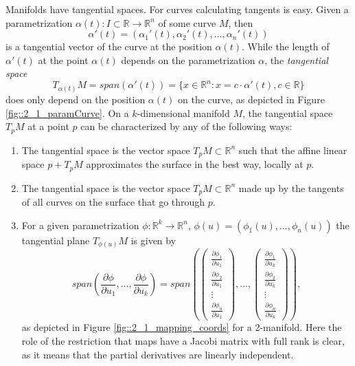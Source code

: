 Manifolds have tangential spaces.
For curves calculating tangents is easy. Given a parametrization $\alpha(t): I \subset \mathbb R \to \mathbb R^n$ of some curve $M$, then $$\alpha'(t) = (\alpha_1'(t),\alpha_2'(t),...,\alpha_n'(t))$$ is a tangential vector of the curve at the position $\alpha(t)$. 		While the length of $\alpha'(t)$ at the point $\alpha(t)$ depends on the parametrization $\alpha$,  the \emph{tangential space} $$ T_{\alpha(t)}M = span(\alpha'(t)) = \{x \in \mathbb R^n: x = c \cdot\alpha'(t), c \in \mathbb R\}$$ does only depend on the position $\alpha(t)$ on the curve, as depicted in Figure \ref{fig::2_1_paramCurve}. 
On a $k$-dimensional manifold $M$, the tangential space $T_p M$ at a point $p$ can be characterized by any of the following ways:

\begin{enumerate}
	\item The tangential space is the vector space $T_pM\subset \mathbb R^n$ such that the affine linear space $p + T_p M$ approximates the surface in the best way, locally at $p$.
	\item The tangential space is the vector space $T_pM\subset \mathbb R^n$ made up by the tangents of all curves on the surface that go through $p$.
	\item For a given parametrization $\phi: \mathbb R^k \to \mathbb R^n$, $\phi(u) = (\phi_1(u),...,\phi_n(u))$ the tangential plane $T_{\phi(u)}M$ is given by
			\[span(\frac{\partial \phi} {\partial u_1},..., \frac{\partial \phi} {\partial u_k}) = span(\begin{pmatrix}
	\frac{\partial \phi_1} {\partial u_1} \\
	\frac{\partial \phi_2} {\partial u_1}\\
	\vdots\\
	\frac{\partial \phi_n} {\partial u_1}
\end{pmatrix},...,\begin{pmatrix}
	\frac{\partial \phi_1} {\partial u_k} \\
	\frac{\partial \phi_2} {\partial u_k}\\
	\vdots\\
	\frac{\partial \phi_n} {\partial u_k}
\end{pmatrix}),\]
as depicted in Figure \ref{fig::2_1_mapping_coords} for a 2-manifold. Here the role of the restriction that maps have a Jacobi matrix with full rank is clear, as it means that the partial derivatives are linearly independent.
\end{enumerate}

